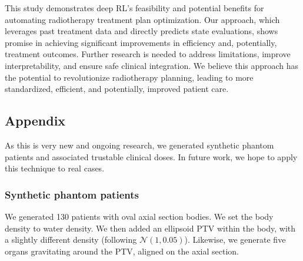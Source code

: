 This study demonstrates deep RL's feasibility and potential benefits for automating radiotherapy treatment plan optimization.
Our approach, which leverages past treatment data and directly predicts state evaluations, shows promise in achieving significant improvements in efficiency and, potentially, treatment outcomes.
Further research is needed to address limitations, improve interpretability, and ensure safe clinical integration.
We believe this approach has the potential to revolutionize radiotherapy planning, leading to more standardized, efficient, and potentially, improved patient care.

\subsection*{Appendix}
As this is very new and ongoing research, we generated synthetic phantom patients and associated trustable clinical doses.
In future work, we hope to apply this technique to real cases.

\subsubsection*{Synthetic phantom patients}
We generated 130 patients with oval axial section bodies.
We set the body density to water density.
We then added an ellipsoid PTV within the body, with a slightly different density (following $\mathcal{N}(1,0.05)$).
Likewise, we generate five organs gravitating around the PTV, aligned on the axial section.

